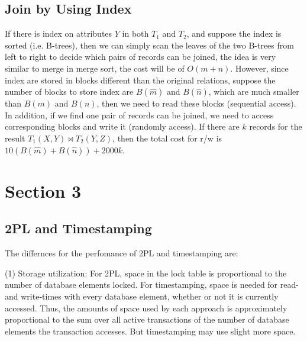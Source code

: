 \documentclass{article}
\begin{document}
\goodbreak

\subsection{Join by Using Index}

If there is index on attributes $Y$ in both $T_{1}$ and $T_{2}$, and suppose the index is sorted (i.e. B-trees), then we can simply scan the leaves of the two B-trees from left to right to decide which pairs of records can be joined, the idea is very similar to merge in merge sort, the cost will be of $O(m+n)$. However, since index are stored in blocks different than the original relations, suppose the number of blocks to store index are $B(\hat{m})$ and $B(\hat{n})$, which are much smaller than $B(m)$ and $B(n)$, then we need to read these blocks (sequential access). In addition, if we find one pair of records can be joined, we need to access corresponding blocks and write it (randomly access). If there are $k$ records for the result $T_{1}(X,Y)\Join T_{2}(Y,Z)$, then the total cost for r/w is $10(B(\hat{m})+B(\hat{n}))+2000k$.

\goodbreak

\section{Section 3}

\subsection{2PL and Timestamping}

The differnces for the perfomance of 2PL and timestamping are:

\noindent (1) Storage utilization: For 2PL, space in the lock table is proportional to the number of database elements locked. For timestamping, space is needed for read- and write-times with every database element, whether or not it is currently accessed. Thus, the amounts of space used by each approach is approximately proportional to the sum over all active transactions of the number of database elements the transaction accesses. But timestamping may use slight more space.
\end{document}
